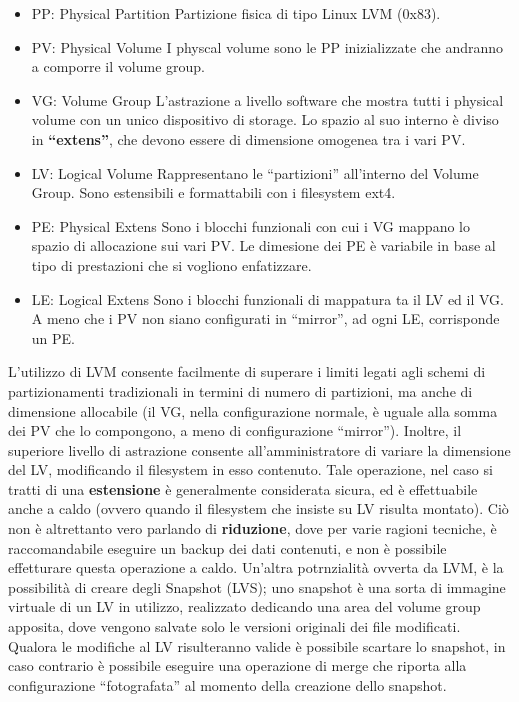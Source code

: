\begin{itemize}
 \item PP: Physical Partition
 \subitem Partizione fisica di tipo Linux LVM (0x83).
 \item PV: Physical Volume
 \subitem I physcal volume sono le PP inizializzate che andranno a comporre il volume group.
 \item VG: Volume Group
 \subitem L'astrazione a livello software che mostra tutti i physical volume con un unico dispositivo di storage. Lo spazio al suo interno è diviso in \textbf{``extens''}, che devono essere di dimensione omogenea tra i vari PV. 
 \item LV: Logical Volume
 \subitem Rappresentano le ``partizioni'' all'interno del Volume Group. Sono estensibili e formattabili con i filesystem ext4. 
 \item PE: Physical Extens
 \subitem Sono i blocchi funzionali con cui i VG mappano lo spazio di allocazione sui vari PV. Le dimesione dei PE è variabile in base al tipo di prestazioni che si vogliono enfatizzare.  
 \item LE: Logical Extens
 \subitem Sono i blocchi funzionali di mappatura ta il LV ed il VG. A meno che i PV non siano configurati in ``mirror'', ad ogni LE, corrisponde un PE. 
\end{itemize}

L'utilizzo di LVM consente facilmente di superare i limiti legati agli schemi di partizionamenti tradizionali in termini di numero di partizioni, ma anche di dimensione allocabile (il VG, nella configurazione normale, è uguale alla somma dei PV che lo compongono, a meno di configurazione ``mirror''). 
Inoltre, il superiore livello di astrazione consente all'amministratore di variare la dimensione del LV, modificando il filesystem in esso contenuto. 
Tale operazione, nel caso si tratti di una \textbf{estensione} è generalmente considerata sicura, ed è effettuabile anche a caldo (ovvero quando il filesystem che insiste su LV risulta montato). Ciò non è altrettanto vero parlando di \textbf{riduzione}, dove per varie ragioni tecniche, è raccomandabile eseguire un backup dei dati contenuti, e non è possibile effetturare questa operazione a caldo. 
Un'altra potrnzialità ovverta da LVM, è la possibilità di creare degli Snapshot (LVS); uno snapshot è una sorta di immagine virtuale di un LV in utilizzo, realizzato dedicando una area del volume group apposita, dove vengono salvate solo le versioni originali dei file modificati.
Qualora le modifiche al LV risulteranno valide è possibile scartare lo snapshot, in caso contrario è possibile eseguire una operazione di merge che riporta alla configurazione ``fotografata'' al momento della creazione dello snapshot.

